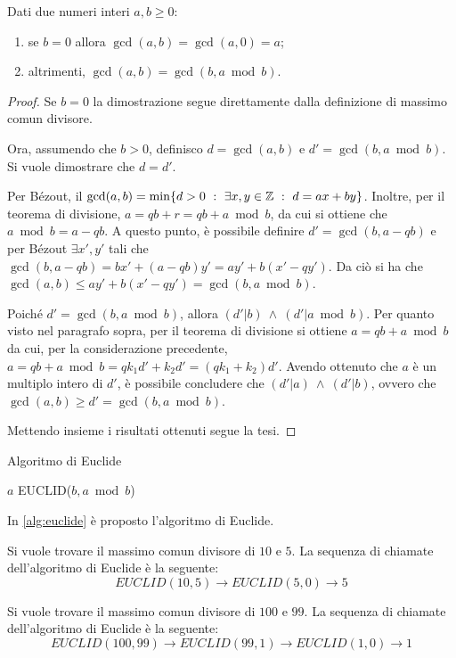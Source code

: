 \begin{proposizione}
Dati due numeri interi $a,b\geq 0$:
\begin{enumerate}
\item se $b=0$ allora $\gcd(a,b)=\gcd(a,0)=a$;
\item altrimenti, $\gcd(a,b)=\gcd(b,a\bmod b)$.
\end{enumerate}
\end{proposizione}
\begin{proof}
Se $b=0$ la dimostrazione segue direttamente dalla definizione di massimo comun divisore.

Ora, assumendo che $b>0$, definisco $d=\gcd(a,b)$ e $d'=\gcd(b,a\bmod b)$. Si vuole dimostrare che $d=d'$.

Per Bézout, il $\gcd(a,b)=\min\{d>0\ :\ \exists x,y\in\Z\ :\ d=ax+by\}$. Inoltre, per il teorema di divisione, $a=qb+r=qb+a\bmod b$, da cui si ottiene che $a\bmod b=a-qb$. A questo punto, è possibile definire $d'=\gcd(b,a-qb)$ e per Bézout $\exists x',y'$ tali che $\gcd(b,a-qb)=bx' + (a-qb)y'=ay' + b(x'-qy')$. Da ciò si ha che $\gcd(a,b)\leq ay' + b(x'-qy') = \gcd(b,a\bmod b)$.

Poiché $d'=\gcd(b,a\bmod b)$, allora $(d'|b)\ \land\ (d'|a\bmod b)$. Per quanto visto nel paragrafo sopra, per il teorema di divisione si ottiene $a=qb+a\bmod b$ da cui, per la considerazione precedente, $a=qb+a\bmod b=qk_1d'+k_2d'=(qk_1+k_2)d'$. Avendo ottenuto che $a$ è un multiplo intero di $d'$, è possibile concludere che $(d'|a)\ \land\ (d'|b)$, ovvero che $\gcd(a,b)\geq d'=\gcd(b,a\bmod b)$.

Mettendo insieme i risultati ottenuti segue la tesi.
\end{proof}

\begin{algorithm}
\caption{Algoritmo di Euclide}
\label{alg:euclide}
\begin{algorithmic}
		\State \Return $a$
	\EndIf
	\State \Return EUCLID($b,a\bmod b$)
\EndFunction
\end{algorithmic}
\end{algorithm}

In \ref{alg:euclide} è proposto l'algoritmo di Euclide.

\begin{esempio}
Si vuole trovare il massimo comun divisore di $10$ e $5$. La sequenza di chiamate dell'algoritmo di Euclide è la seguente:
\[
 EUCLID(10,5) \longrightarrow EUCLID(5,0) \longrightarrow 5
\]
\end{esempio}
\begin{esempio}
Si vuole trovare il massimo comun divisore di $100$ e $99$. La sequenza di chiamate dell'algoritmo di Euclide è la seguente:
\[
 EUCLID(100,99) \longrightarrow EUCLID(99,1) \longrightarrow EUCLID(1,0) \longrightarrow 1
\]
\end{esempio}



